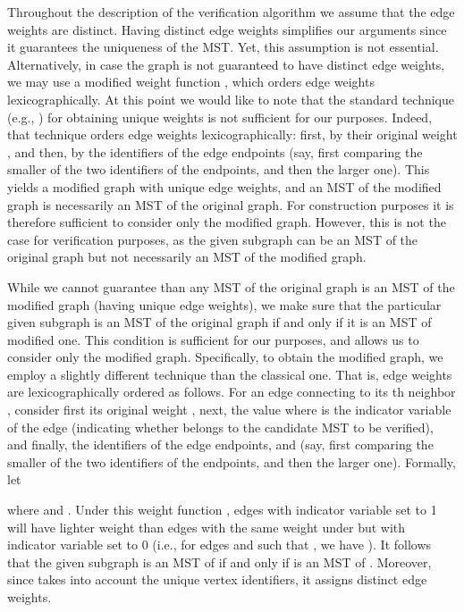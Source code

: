 \documentclass[11pt,letter]{article}
\begin{document}
Throughout the description of the verification algorithm we assume that 
the edge weights are distinct. Having distinct edge weights simplifies our arguments   
since it guarantees the uniqueness of the MST. Yet,  this assumption is not essential. Alternatively, in case the graph is not guaranteed 
to have distinct edge weights, we may use a modified weight function 
, which orders edge weights lexicographically. 
At this point we would like to note that the standard technique (e.g., \cite{GHS_83}) for obtaining unique weights is not sufficient for our purposes. 
Indeed, that technique orders edge weights lexicographically:  
first, by their original weight , and then, by the identifiers of 
the edge endpoints (say, first comparing the smaller of the two identifiers of the endpoints, and then the larger one). 
This yields a modified graph with unique edge weights, and an MST of the modified graph is necessarily an MST of the original graph. 
For construction purposes it is therefore sufficient to consider only 
the modified graph. However, this is not the case for verification purposes, 
as the given subgraph can be an MST of the original graph but not necessarily 
an MST of the modified graph. 

While we cannot guarantee than any MST of the original graph is an MST of 
the modified graph (having unique edge weights), we make sure that 
the particular given subgraph  is an MST of the original graph 
if and only if it is an MST of modified one. This condition is sufficient for our purposes, and allows us to consider only the modified graph.
Specifically, to obtain the modified graph, we employ a slightly different 
technique than the classical one. 
That is, edge weights are lexicographically ordered as follows.
For an edge  connecting  to its th neighbor , 
consider first its original weight , 
next, the value  where  is the indicator variable of the edge
 (indicating whether  belongs to the candidate MST to be verified), 
and finally, the identifiers of the edge endpoints,  and 
(say, first comparing the smaller of the two identifiers of the endpoints, 
and then the larger one). 
Formally, let 

where 
and .
Under this weight function , edges with indicator variable set to 1
will have lighter weight than edges with the same weight under  
but with indicator variable set to 0 
(i.e., for edges  and  such that 
, we have ).
It follows that  the given subgraph  
 is an MST of  if and only if   is an MST
of . Moreover, since  takes into account  
the unique vertex identifiers, it assigns distinct edge weights.
\end{document}
